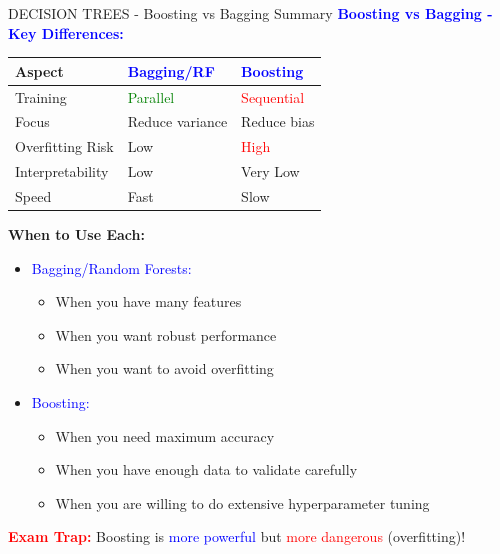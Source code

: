 \documentclass[8pt]{beamer}
\begin{document}
	\begin{frame}{DECISION TREES - Boosting vs Bagging Summary}
		\fontsize{6.5}{7.5}\selectfont
		\textcolor{blue}{\textbf{Boosting vs Bagging - Key Differences:}}
		
		\begin{tabular}{|p{3.5cm}|p{3.5cm}|p{3.5cm}|}
			\hline
			\textbf{Aspect} & \textcolor{blue}{Bagging/RF} & \textcolor{blue}{Boosting} \\
			\hline
			Training & \textcolor{green}{Parallel} & \textcolor{red}{Sequential} \\
			\hline
			Focus & Reduce variance & Reduce bias \\
			\hline
			Overfitting Risk & Low & \textcolor{red}{High} \\
			\hline
			Interpretability & Low & Very Low \\
			\hline
			Speed & Fast & Slow \\
			\hline
		\end{tabular}
		
		\textbf{When to Use Each:}
		
		\begin{itemize}
			\item \textcolor{blue}{Bagging/Random Forests:}
			\begin{itemize}
				\item When you have many features
				\item When you want robust performance
				\item When you want to avoid overfitting
			\end{itemize}
			
			\item \textcolor{blue}{Boosting:}
			\begin{itemize}
				\item When you need maximum accuracy
				\item When you have enough data to validate carefully
				\item When you are willing to do extensive hyperparameter tuning
			\end{itemize}
		\end{itemize}
		
		\textcolor{red}{\textbf{Exam Trap:}} Boosting is \textcolor{blue}{more powerful} but \textcolor{red}{more dangerous} (overfitting)!
	\end{frame}
	
\end{document}
